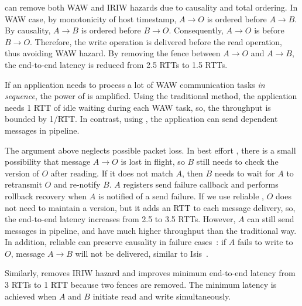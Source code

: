 \sys{} can remove both WAW and IRIW hazards due to causality and total ordering.
In WAW case, by monotonicity of host timestamp, $A \rightarrow O$ is ordered before $A \rightarrow B$. By causality, $A \rightarrow B$ is ordered before $B \rightarrow O$.
Consequently, $A \rightarrow O$ is before $B \rightarrow O$.
Therefore, the write operation is delivered before the read operation, thus avoiding WAW hazard.
By removing the fence between $A \rightarrow O$ and $A \rightarrow B$, the end-to-end latency is reduced from 2.5 RTTs to 1.5 RTTs.



If an application needs to process a lot of WAW communication tasks \emph{in sequence}, the power of \sys{} is amplified. Using the traditional method, the application needs 1 RTT of idle waiting during each WAW task, so, the throughput is bounded by 1/RTT. In contrast, using \sys{}, the application can send dependent messages in pipeline. %

The argument above neglects possible packet loss.
In best effort \sys{}, there is a small possibility that message $A \rightarrow O$ is lost in flight, so $B$ still needs to check the version of $O$ after reading. If it does not match $A$, then $B$ needs to wait for $A$ to retransmit $O$ and re-notify $B$.
$A$ registers send failure callback and performs rollback recovery when $A$ is notified of a send failure.
If we use reliable \sys{}, $O$ does not need to maintain a version, but it adds an RTT to each message delivery, so, the end-to-end latency increases from 2.5 to 3.5 RTTs. However, $A$ can still send messages in pipeline, and have much higher throughput than the traditional way.
In addition, reliable \sys can preserve causality in failure cases~\cite{birman1994response}: if $A$ fails to write to $O$, message $A \rightarrow B$ will not be delivered, similar to Isis~\cite{birman1984overview}.

Similarly, \sys{} removes IRIW hazard and improves minimum end-to-end latency from 3 RTTs to 1 RTT because two fences are removed. The minimum latency is achieved when $A$ and $B$ initiate read and write simultaneously.

